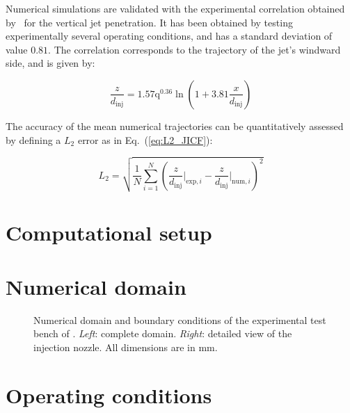 Numerical simulations are validated with the experimental correlation obtained by~\cite{ref:Becker2002} for the vertical jet penetration. It has been obtained by testing experimentally several operating conditions, and has a standard deviation of value $0.81$. The correlation corresponds to the trajectory of the jet's windward side, and is given by:

\begin{equation}
    \label{eq:jicf_trajectory_becker}
    \frac{z}{d_\mathrm{inj}} = 1.57 \mathrm{q}^{0.36} \ln \left( 1 + 3.81 \frac{x}{d_\mathrm{inj}} \right)
\end{equation}

The accuracy of the mean numerical trajectories can be quantitatively assessed by defining a $L_2$ error as in Eq.~(\ref{eq:L2_JICF}): 

\begin{equation}
\label{eq:L2_JICF}
    L_2 = \sqrt{\frac{1}{N}   \sum_{i=1}^N \left( \frac{z}{d_\mathrm{inj}} \Bigr|_{\mathrm{exp},i} -   \frac{z}{d_\mathrm{inj}} \Bigr|_{\mathrm{num},i} \right)^2}
\end{equation}

\section{Computational setup}
	\label{sec:computational_setup}


\section*{Numerical domain}


\begin{figure}[ht]
     \centering
      \caption{Numerical domain and boundary conditions of the experimental test bench of . \textsl{Left}: complete domain. \textsl{Right}: detailed view of the injection nozzle. All dimensions are in mm.}
      \label{fig:numerical_setup_maquette_JICF_DLR}
\end{figure}

\section*{Operating conditions}


